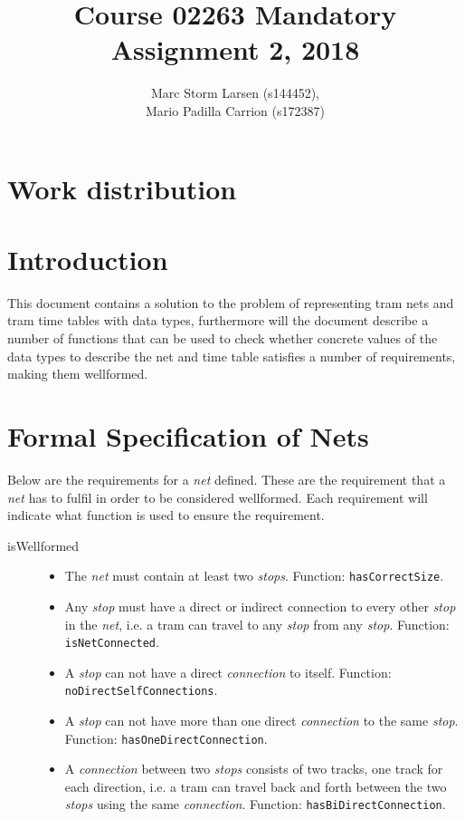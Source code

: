 \documentclass[a4]{article}
\title{Course 02263 Mandatory Assignment 2, 2018}
\author{Marc Storm Larsen (s144452),\\ 
        Mario Padilla Carrion (s172387)}
\begin{document}
\maketitle

\tableofcontents
\newpage

\section{Work distribution}

\section{Introduction}
This document contains a solution to the problem of representing tram nets and tram time tables with data types, furthermore will the document describe a number of functions that can be used to check whether concrete values of the data types to describe the net and time table satisfies a number of requirements, making them wellformed.

\section{Formal Specification of Nets}



\noindent Below are the requirements for a \emph{net} defined. These are the requirement that a \emph{net} has to fulfil in order to be considered wellformed. Each requirement will indicate what function is used to ensure the requirement. \\

\begin{description}
    \item[isWellformed] \hfill
        \begin{itemize}
            \item The \emph{net} must contain at least two \emph{stops}. Function: \verb=hasCorrectSize=.
            \item Any \emph{stop} must have a direct or indirect connection to every other \emph{stop} in the \emph{net}, i.e. a tram can travel to any \emph{stop} from any \emph{stop}. Function: \verb=isNetConnected=.
            \item A \emph{stop} can not have a direct \emph{connection} to itself. Function: \verb=noDirectSelfConnections=.
            \item A \emph{stop} can not have more than one direct \emph{connection} to the same \emph{stop}. Function: \verb=hasOneDirectConnection=.
            \item A \emph{connection} between two \emph{stops} consists of two tracks, one track for each direction, i.e. a tram can travel back and forth between the two \emph{stops} using the same \emph{connection}. Function: \verb=hasBiDirectConnection=.
        \end{itemize}
\end{description}
\end{document}
